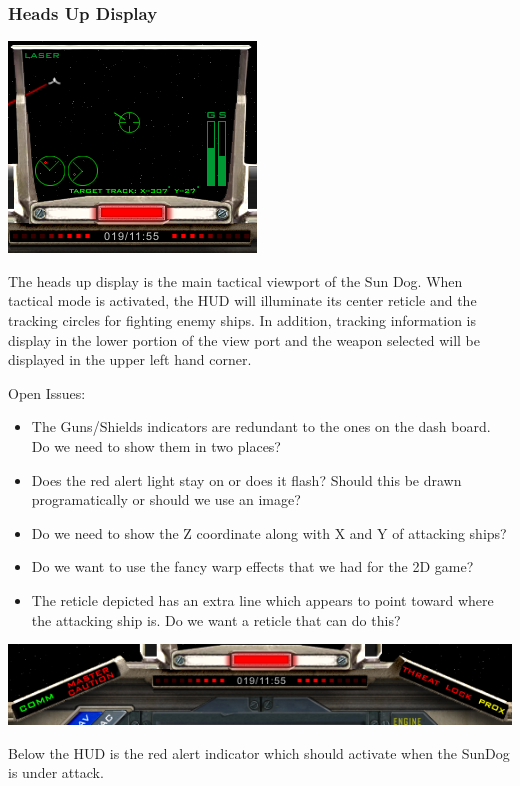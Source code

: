 \subsubsection{Heads Up Display}

\includegraphics[scale=0.7]{images/hud.png}

The heads up display is the main tactical viewport of the Sun Dog.  When
tactical mode is activated, the HUD will illuminate its center reticle
and the tracking circles for fighting enemy ships.  In addition, tracking
information is display in the lower portion of the view port and the
weapon selected will be displayed in the upper left hand corner.


Open Issues:
\begin{itemize}
\item The Guns\slash Shields indicators are redundant to the ones on
the dash board.  Do we need to show them in two places?
\item Does the red alert light stay on or does it flash?  Should this be
drawn programatically or should we use an image?
\item Do we need to show the Z coordinate along with X and Y of attacking
ships?
\item Do we want to use the fancy warp effects that we had for the 2D
game?
\item The reticle depicted has an extra line which appears to point toward
where the attacking ship is.  Do we want a reticle that can do this?
\end{itemize}

\includegraphics[scale=0.7]{images/lower-hud.png}

Below the HUD is the red alert indicator which should activate when the
SunDog is under attack.


